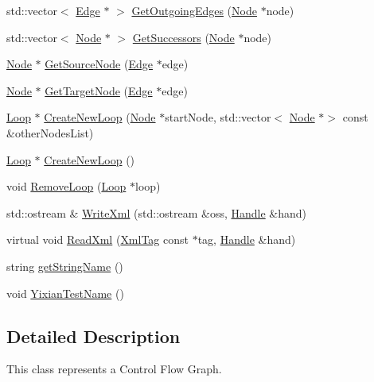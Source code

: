 \begin{DoxyCompactItemize}
\item 
std\+::vector$<$ \hyperlink{classcfglib_1_1Edge}{Edge} $\ast$ $>$ \hyperlink{classcfglib_1_1Cfg_aea82731a4de76ef618bc91e8ab11c56b}{Get\+Outgoing\+Edges} (\hyperlink{classcfglib_1_1Node}{Node} $\ast$node)
\item 
std\+::vector$<$ \hyperlink{classcfglib_1_1Node}{Node} $\ast$ $>$ \hyperlink{classcfglib_1_1Cfg_a4f52a0e3814e4d404d5520437d27d407}{Get\+Successors} (\hyperlink{classcfglib_1_1Node}{Node} $\ast$node)
\item 
\hyperlink{classcfglib_1_1Node}{Node} $\ast$ \hyperlink{classcfglib_1_1Cfg_a1b40c4d28399a71195159b3fc1057399}{Get\+Source\+Node} (\hyperlink{classcfglib_1_1Edge}{Edge} $\ast$edge)
\item 
\hyperlink{classcfglib_1_1Node}{Node} $\ast$ \hyperlink{classcfglib_1_1Cfg_aaf238d539a151d6087a9381f5a89555e}{Get\+Target\+Node} (\hyperlink{classcfglib_1_1Edge}{Edge} $\ast$edge)
\item 
\hyperlink{classcfglib_1_1Loop}{Loop} $\ast$ \hyperlink{classcfglib_1_1Cfg_a5c751a3e53b10ecdae556b2936e5303c}{Create\+New\+Loop} (\hyperlink{classcfglib_1_1Node}{Node} $\ast$start\+Node, std\+::vector$<$ \hyperlink{classcfglib_1_1Node}{Node} $\ast$$>$ const \&other\+Nodes\+List)
\item 
\hyperlink{classcfglib_1_1Loop}{Loop} $\ast$ \hyperlink{classcfglib_1_1Cfg_af8e183cfc272143b47dc856f8f368627}{Create\+New\+Loop} ()
\item 
void \hyperlink{classcfglib_1_1Cfg_a4c71befb94beac37921b82361825cc54}{Remove\+Loop} (\hyperlink{classcfglib_1_1Loop}{Loop} $\ast$loop)
\item 
std\+::ostream \& \hyperlink{classcfglib_1_1Cfg_a05c9fc4c8a7e5c0850e6998722433787}{Write\+Xml} (std\+::ostream \&oss, \hyperlink{classcfglib_1_1Handle}{Handle} \&hand)
\item 
virtual void \hyperlink{classcfglib_1_1Cfg_a3525e0c748971e945193da2a0dd4b571}{Read\+Xml} (\hyperlink{classXmlTag}{Xml\+Tag} const $\ast$tag, \hyperlink{classcfglib_1_1Handle}{Handle} \&hand)
\item 
string \hyperlink{classcfglib_1_1Cfg_ae9317f335c39263f55484b0149725d4c}{get\+String\+Name} ()
\item 
void \hyperlink{classcfglib_1_1Cfg_ad939d89b58f8de319335e307069ae2ab}{Yixian\+Test\+Name} ()
\end{DoxyCompactItemize}


\subsection{Detailed Description}
This class represents a Control Flow Graph. 

